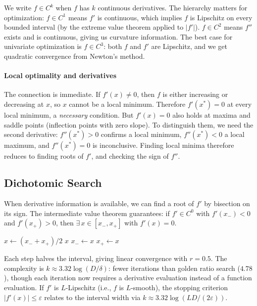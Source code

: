 We write $f \in C^k$ when $f$ has $k$ continuous derivatives.
The hierarchy matters for optimization:
$f \in C^1$ means $f'$ is continuous, which implies $f$ is Lipschitz on every bounded interval (by the extreme value theorem applied to $|f'|$).
$f \in C^2$ means $f''$ exists and is continuous, giving us curvature information.
The best case for univariate optimization is $f \in C^3$: both $f$ and $f'$ are Lipschitz, and we get quadratic convergence from Newton's method.

\paragraph{Local optimality and derivatives}

The connection is immediate.
If $f'(x) \neq 0$, then $f$ is either increasing or decreasing at $x$, so $x$ cannot be a local minimum.
Therefore $f'(x^*) = 0$ at every local minimum, a \emph{necessary} condition.
But $f'(x) = 0$ also holds at maxima and saddle points (inflection points with zero slope).
To distinguish them, we need the second derivative: $f''(x^*) > 0$ confirms a local minimum, $f''(x^*) < 0$ a local maximum, and $f''(x^*) = 0$ is inconclusive.
Finding local minima therefore reduces to finding roots of $f'$, and checking the sign of $f''$.


\subsection{Dichotomic Search}\label{sec:dichotomic}

When derivative information is available, we can find a root of $f'$ by bisection on its sign.
The intermediate value theorem guarantees: if $f' \in C^0$ with $f'(x_-) < 0$ and $f'(x_+) > 0$, then $\exists\, x \in [x_-, x_+]$ with $f'(x) = 0$.

\begin{algorithm}
	\caption{Dichotomic Search (DS)}
	\begin{algorithmic}[1]
			\Repeat
				\State $x \gets (x_- + x_+) / 2$
				 \Return $x$ \EndIf
					\State $x_- \gets x$ 
				\Else
					\State $x_+ \gets x$ 
				\EndIf
		\EndProcedure
	\end{algorithmic}
\end{algorithm}

Each step halves the interval, giving linear convergence with $r = 0.5$.
The complexity is $k \approx 3.32 \log(D / \delta)$: fewer iterations than golden ratio search ($4.78$), though each iteration now requires a derivative evaluation instead of a function evaluation.
If $f'$ is $L$-Lipschitz (i.e., $f$ is $L$-smooth), the stopping criterion $|f'(x)| \leq \varepsilon$ relates to the interval width via $k \approx 3.32 \log(LD / (2\varepsilon))$.

